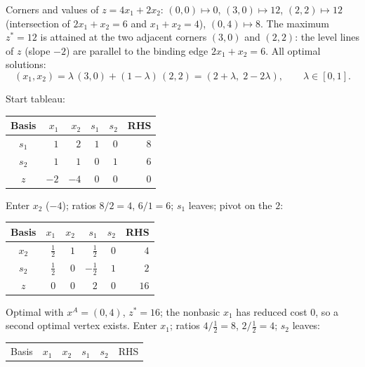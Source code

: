 \begin{solutions}
  \item Corners and values of $z=4x_1+2x_2$: $(0,0)\mapsto 0$,
        $(3,0)\mapsto 12$, $(2,2)\mapsto 12$ (intersection of
        $2x_1+x_2=6$ and $x_1+x_2=4$), $(0,4)\mapsto 8$. The maximum
        $z^{*}=12$ is attained at the two adjacent corners $(3,0)$ and
        $(2,2)$: the level lines of $z$ (slope $-2$) are parallel to the
        binding edge $2x_1+x_2=6$. All optimal solutions:
        \[
          (x_1,x_2)=\lambda\,(3,0)+(1-\lambda)\,(2,2)
                   =(2+\lambda,\;2-2\lambda),\qquad \lambda\in[0,1].
        \]

  \item Start tableau:
        \begin{center}
        \begin{tabular}{c|rrrr|r}
        \hline
        Basis & $x_1$ & $x_2$ & $s_1$ & $s_2$ & RHS\\
        \hline
        $s_1$ & $1$ & $2$ & $1$ & $0$ & $8$\\
        $s_2$ & $1$ & $1$ & $0$ & $1$ & $6$\\
        \hline
        $z$ & $-2$ & $-4$ & $0$ & $0$ & $0$\\
        \hline
        \end{tabular}
        \end{center}
        Enter $x_2$ ($-4$); ratios $8/2=4$, $6/1=6$; $s_1$ leaves; pivot
        on the $2$:
        \begin{center}
        \begin{tabular}{c|rrrr|r}
        \hline
        Basis & $x_1$ & $x_2$ & $s_1$ & $s_2$ & RHS\\
        \hline
        $x_2$ & $\tfrac{1}{2}$ & $1$ & $\tfrac{1}{2}$ & $0$ & $4$\\
        $s_2$ & $\tfrac{1}{2}$ & $0$ & $-\tfrac{1}{2}$ & $1$ & $2$\\
        \hline
        $z$ & $0$ & $0$ & $2$ & $0$ & $16$\\
        \hline
        \end{tabular}
        \end{center}
        Optimal with $x^{A}=(0,4)$, $z^{*}=16$; the nonbasic $x_1$ has
        reduced cost $0$, so a second optimal vertex exists. Enter $x_1$;
        ratios $4/\tfrac{1}{2}=8$, $2/\tfrac{1}{2}=4$; $s_2$ leaves:
        \begin{center}
        \begin{tabular}{c|rrrr|r}
        \hline
        Basis & $x_1$ & $x_2$ & $s_1$ & $s_2$ & RHS\\

\end{tabular}
\end{center}
\end{solutions}
